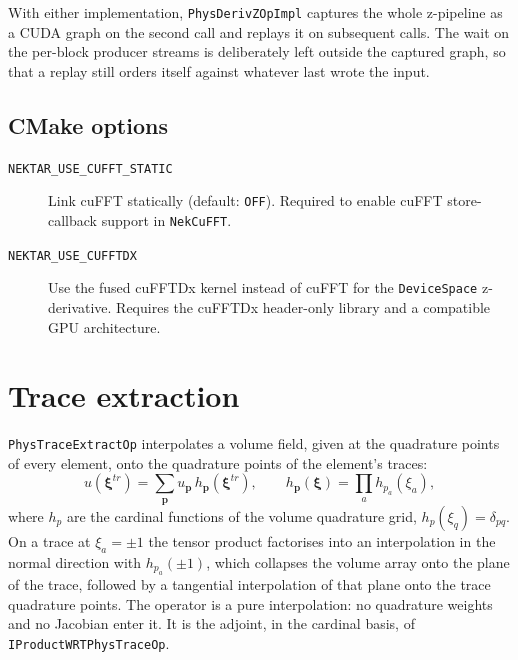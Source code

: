 With either implementation, \texttt{PhysDerivZOpImpl} captures the whole
z-pipeline as a CUDA graph on the second call and replays it on subsequent
calls. The wait on the per-block producer streams is deliberately left
outside the captured graph, so that a replay still orders itself against
whatever last wrote the input.

\subsection{CMake options}

\begin{description}
  \item[\texttt{NEKTAR\_USE\_CUFFT\_STATIC}] Link cuFFT statically
    (default: \texttt{OFF}).  Required to enable cuFFT store-callback
    support in \texttt{NekCuFFT}.
  \item[\texttt{NEKTAR\_USE\_CUFFTDX}] Use the fused cuFFTDx kernel instead
    of cuFFT for the \texttt{DeviceSpace} z-derivative.  Requires the
    cuFFTDx header-only library and a compatible GPU architecture.
\end{description}

\section{Trace extraction}
\label{sec:phystraceextract}

\texttt{PhysTraceExtractOp} interpolates a volume field, given at the
quadrature points of every element, onto the quadrature points of the
element's traces:
\begin{equation}
  u(\boldsymbol\xi^{tr}) = \sum_{\boldsymbol p} u_{\boldsymbol p}\,
  h_{\boldsymbol p}(\boldsymbol\xi^{tr}),
  \qquad
  h_{\boldsymbol p}(\boldsymbol\xi) = \prod_a h_{p_a}(\xi_a),
\end{equation}
where $h_{p}$ are the cardinal functions of the volume quadrature grid,
$h_p(\xi_q) = \delta_{pq}$. On a trace at $\xi_a = \pm 1$ the tensor
product factorises into an interpolation in the normal direction with
$h_{p_a}(\pm 1)$, which collapses the volume array onto the plane of the
trace, followed by a tangential interpolation of that plane onto the trace
quadrature points. The operator is a pure interpolation: no quadrature
weights and no Jacobian enter it. It is the adjoint, in the cardinal basis,
of \texttt{IProductWRTPhysTraceOp}.

